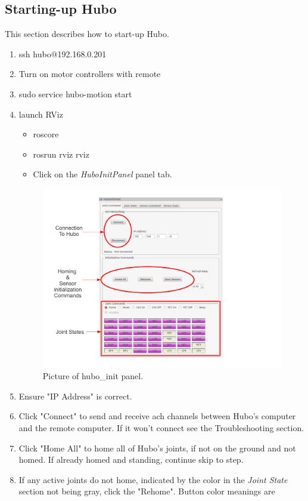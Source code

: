 \documentclass[letterpaper, 10 pt]{report}
\begin{document}
\subsection*{Starting-up Hubo}
This section describes how to start-up Hubo.
\begin{enumerate}
  \item ssh hubo@192.168.0.201
  \item Turn on motor controllers with remote
  \item sudo service hubo-motion start
  \item launch RViz
    \begin{itemize}
    	  \item roscore
    	  \item rosrun rviz rviz
    	  \item Click on the \textit{HuboInitPanel} panel tab.
    \end{itemize}
  \begin{figure}[ht]
    \centering
    \includegraphics[width=15.0cm]{resources/hubo-init.pdf}
    \caption{Picture of hubo\_init panel.}
    \label{fig:hubo-init-image}
  \end{figure}
  \item Ensure "IP Address" is correct.
  \item Click "Connect" to send and receive ach channels between Hubo's computer and the remote computer. If it won't connect see the Troubleshooting section.
  \item Click "Home All" to home all of Hubo's joints, if not on the ground and not homed. If already homed and standing, continue skip to step.
  \item If any active joints do not home, indicated by the color in the \textit{Joint State} section not being gray, click the "Rehome". Button color meanings are

\end{enumerate}
\end{document}
